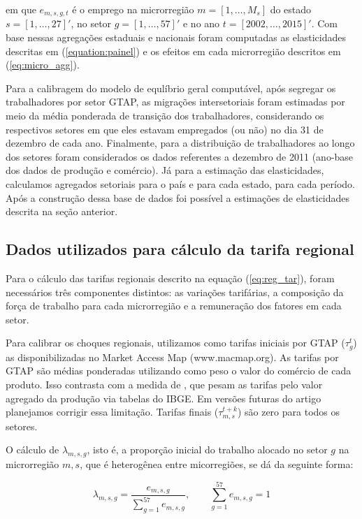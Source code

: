 \documentclass{article}
\begin{document}
em que $e_{m,s,g,t}$ é o emprego na microrregião $m = [1, \hdots, M_s]$ do estado $s = [1, \hdots, 27]'$, no setor $g = [1, \hdots, 57]'$ e no ano $t = [2002, \hdots, 2015]'$. Com base nessas agregações estaduais e nacionais foram computadas as elasticidades descritas em (\ref{equation:painel}) e os efeitos em cada microrregião descritos em (\ref{eq:micro_agg}).

Para a calibragem do modelo de equlíbrio geral computável, após segregar os trabalhadores por setor GTAP, as migrações intersetoriais foram estimadas por meio da média ponderada de transição dos trabalhadores, considerando os respectivos setores em que eles estavam empregados (ou não) no dia 31 de dezembro de cada ano. Finalmente, para a distribuição de trabalhadores ao longo dos setores foram considerados os dados referentes a dezembro de 2011 (ano-base dos dados de produção e comércio). Já para a estimação das elasticidades, calculamos agregados setoriais para o país e para cada estado, para cada período. Após a construção dessa base de dados foi possível a estimações de elasticidades descrita na seção anterior.

\subsection{Dados utilizados para cálculo da tarifa regional}

Para o cálculo das tarifas regionais descrito na equação (\ref{eq:reg_tar}), foram necessários três componentes distintos: as variações tarifárias, a composição da força de trabalho para cada microrregião e a remuneração dos fatores em cada setor.

Para calibrar os choques regionais, utilizamos como tarifas iniciais por GTAP ($\tau_{g}^t$) as disponibilizadas no Market Access Map (www.macmap.org). As tarifas por GTAP são médias ponderadas utilizando como peso o valor do comércio de cada produto. Isso contrasta com a medida de \textcite{dixkovak}, que pesam as tarifas pelo valor agregado da produção via tabelas do IBGE. Em versões futuras do artigo planejamos corrigir essa limitação. Tarifas finais ($\tau_{m,s}^{t+k}$) são zero para todos os setores.

O cálculo de \(\lambda_{m,s,g}\), isto é, a proporção inicial do trabalho alocado no setor  \(g\) na microrregião \(m,s\), que é heterogênea entre micorregiões, se dá da seguinte forma:

\begin{equation}
    \lambda_{m,s,g} = \frac{e_{m,s,g}}{\sum_{g=1}^{57}e_{m,s,g}}, \qquad \sum_{g=1}^{57}e_{m,s,g} = 1
\end{equation}
\end{document}
